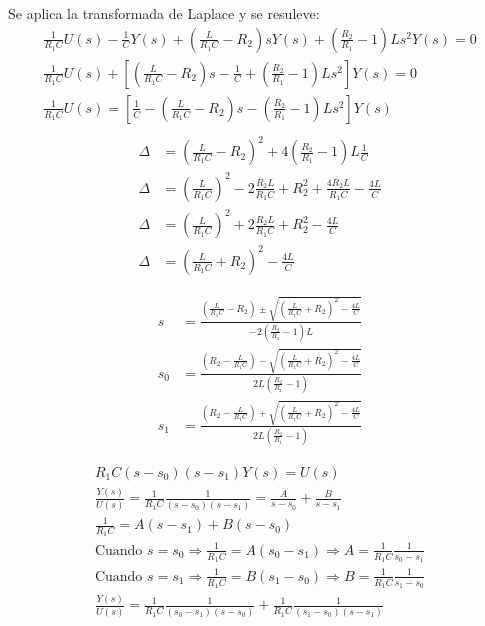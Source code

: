 Se aplica la transformada de Laplace y se resuleve:
\begin{align*}
  \frac{1}{R_1C} U(s) - \frac{1}{C} Y(s) +
  \left( \frac{L}{R_1C} - R_2 \right) s  Y(s) +
  \left( \frac{R_2}{R_1} - 1 \right) L s^2  Y(s) = 0
  \\
  \frac{1}{R_1C} U(s) +
  \left[
    \left( \frac{L}{R_1C} - R_2 \right) s
    - \frac{1}{C}
    + \left( \frac{R_2}{R_1} - 1 \right) L s^2
  \right] Y(s) = 0 \\
  \frac{1}{R_1C} U(s) =
  \left[
    \frac{1}{C}
    - \left( \frac{L}{R_1C} - R_2 \right) s
    - \left( \frac{R_2}{R_1} - 1 \right) L s^2
  \right] Y(s) \\
\end{align*}
\begin{align*}
  \Delta &= \left( \frac{L}{R_1C} - R_2 \right)^2 + 4 \left( \frac{R_2}{R_1} - 1 \right) L \frac{1}{C}   \\
  \Delta &= \left( \frac{L}{R_1C} \right)^2 - 2 \frac{R_2L}{R_1C} + R_2^2 + \frac{4R_2L}{R_1C} - \frac{4L}{C} \\
  \Delta &= \left( \frac{L}{R_1C} \right)^2 + 2 \frac{R_2L}{R_1C} + R_2^2 - \frac{4L}{C} \\
  \Delta &= \left( \frac{L}{R_1C} + R_2 \right)^2 - \frac{4L}{C}
\end{align*}

\begin{align*}
  s &= \frac{\left( \frac{L}{R_1C} - R_2 \right) \pm \sqrt{\left( \frac{L}{R_1C} + R_2 \right)^2 - \frac{4L}{C}}}{-2 \left( \frac{R_2}{R_1} - 1 \right) L } \\
  s_0 &= \frac{\left( R_2 - \frac{L}{R_1C} \right) - \sqrt{\left( \frac{L}{R_1C} + R_2 \right)^2 - \frac{4L}{C}}}{2 L \left( \frac{R_2}{R_1} - 1 \right) } \\
  s_1 &= \frac{\left( R_2 - \frac{L}{R_1C} \right) + \sqrt{\left( \frac{L}{R_1C} + R_2 \right)^2 - \frac{4L}{C}}}{2 L \left( \frac{R_2}{R_1} - 1 \right) }
\end{align*}

\begin{align*}
  R_1C (s-s_0)(s-s_1) Y(s) = U(s) \\
  \frac{Y(s)}{U(s)} = \frac{1}{R_1C} \frac{1}{(s-s_0)(s-s_1)}  = \frac{A}{s-s_0} + \frac{B}{s-s_1} \\
  \frac{1}{R_1C}  = A(s-s_1) + B(s-s_0) \\
  \text{Cuando } s = s_0 \Rightarrow \frac{1}{R_1C}  = A(s_0-s_1) \Rightarrow A = \frac{1}{R_1C} \frac{1}{s_0-s_1} \\
  \text{Cuando } s = s_1 \Rightarrow \frac{1}{R_1C}  = B(s_1-s_0) \Rightarrow B = \frac{1}{R_1C} \frac{1}{s_1-s_0} \\
  \frac{Y(s)}{U(s)} = \frac{1}{R_1C} \frac{1}{(s_0-s_1)(s-s_0)} + \frac{1}{R_1C} \frac{1}{(s_1-s_0)(s-s_1)} \\
\end{align*}

